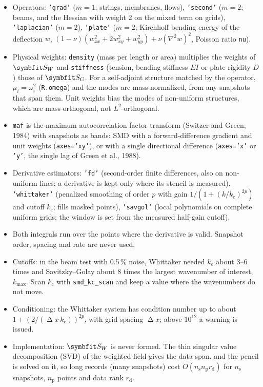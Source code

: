 \documentclass[report]{nld}
\newcommand{\code}[1]{\texttt{#1}}
\begin{document}
\begin{itemize}
\item Operators: \code{'grad'} ($m=1$; strings, membranes, flows), \code{'second'} ($m=2$; beams, and the Hessian with weight 2 on the mixed term on grids), \code{'laplacian'} ($m=2$), \code{'plate'} ($m=2$; Kirchhoff bending energy of the deflection $w$, $(1-\nu)(w_{xx}^2+2w_{xy}^2+w_{yy}^2)+\nu(\nabla^2w)^2$, Poisson ratio \code{nu}).
\item Physical weights: \code{density} (mass per length or area) multiplies the weights of $\symbfit S_W$ and \code{stiffness} (tension, bending stiffness $EI$ or plate rigidity $D$) those of $\symbfit S_G$. For a self-adjoint structure matched by the operator, $\mu_i=\omega_i^2$ (\code{R.omega}) and the modes are mass-normalized, from any snapshots that span them. Unit weights bias the modes of non-uniform structures, which are mass-orthogonal, not $L^2$-orthogonal.
\item \code{maf} is the maximum autocorrelation factor transform (Switzer and Green, 1984) with snapshots as bands: SMD with a forward-difference gradient and unit weights (\code{axes='xy'}), or with a single directional difference (\code{axes='x'} or \code{'y'}, the single lag of Green et al., 1988).
\item Derivative estimators: \code{'fd'} (second-order finite differences, also on non-uniform lines; a derivative is kept only where its stencil is measured), \code{'whittaker'} (penalized smoothing of order $p$ with gain $1/(1+(k/k_{\mathrm c})^{2p})$ and cutoff $k_{\mathrm c}$; fills masked points), \code{'savgol'} (local polynomials on complete uniform grids; the window is set from the measured half-gain cutoff).
\item Both integrals run over the points where the derivative is valid. Snapshot order, spacing and rate are never used.
\item Cutoffs: in the beam test with 0.5\,\% noise, Whittaker needed $k_{\mathrm c}$ about 3--6 times and Savitzky--Golay about 8 times the largest wavenumber of interest, $k_{\max}$. Scan $k_{\mathrm c}$ with \code{smd\_kc\_scan} and keep a value where the wavenumbers do not move.
\item Conditioning: the Whittaker system has condition number up to about $1+(2/(\upDelta x\,k_{\mathrm c}))^{2p}$, with grid spacing $\upDelta x$; above $10^{12}$ a warning is issued.
\item Implementation: $\symbfit S_W$ is never formed. The thin singular value decomposition (SVD) of the weighted field gives the data span, and the pencil is solved on it, so long records (many snapshots) cost $O(n_{\mathrm s}n_{\mathrm p}r_{\mathrm d})$ for $n_{\mathrm s}$ snapshots, $n_{\mathrm p}$ points and data rank $r_{\mathrm d}$.
\end{itemize}
\end{document}
